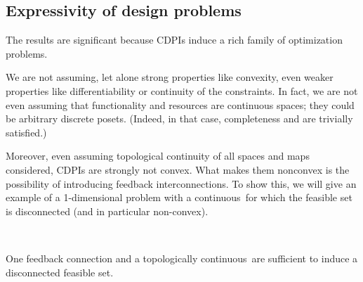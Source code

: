 \subsection{Expressivity of design problems}

The results are significant because CDPIs induce a rich family of optimization problems.

We are not assuming, let alone strong properties like convexity, even weaker properties like differentiability or continuity of the constraints.
In fact, we are not even assuming that functionality and resources are continuous spaces; they could be arbitrary discrete posets.
(Indeed, in that case, completeness and \scottcontinuity are trivially satisfied.)

Moreover, even assuming topological continuity of all spaces and maps considered, CDPIs are strongly not convex.
What makes them nonconvex is the possibility of introducing feedback interconnections.
To show this, we will give an example of a 1-dimensional problem with a continuous~\ftor for which the feasible set is disconnected (and in particular non-convex).

\begin{marginfigure}
    \centering
     \\
    \caption{One feedback connection and a topologically continuous~\ftor are sufficient to induce a disconnected feasible set.}
    \label{fig:ceil-1}
\end{marginfigure}

